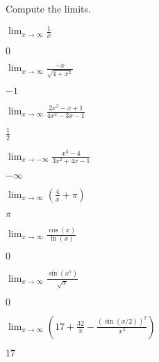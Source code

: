 \begin{exercises}

\noindent Compute the limits.
\twocol
\begin{exercise}
$\lim_{x\to \infty} \frac{1}{x}$
\begin{answer}
$0$
\end{answer}
\end{exercise}

\begin{exercise}
$\lim_{x\to \infty} \frac{-x}{\sqrt{4+x^2}}$
\begin{answer}
$-1$
\end{answer}
\end{exercise}

\begin{exercise}
$\lim_{x\to \infty} \frac{2x^2-x+1}{4x^2-3x-1}$
\begin{answer}
$\frac{1}{2}$
\end{answer}
\end{exercise}

\begin{exercise}
$\lim_{x\to -\infty} \frac{x^3-4}{3x^2+4x-1}$
\begin{answer}
$-\infty$
\end{answer}
\end{exercise}


\begin{exercise}
$\lim_{x\to \infty} \left(\frac{4}{x}+\pi\right)$
\begin{answer}
$\pi$
\end{answer}
\end{exercise}

\begin{exercise}
$\lim_{x\to \infty} \frac{\cos(x)}{\ln(x)}$
\begin{answer}
$0$
\end{answer}
\end{exercise}

\begin{exercise}
$\lim_{x\to \infty} \frac{\sin\left(x^7\right)}{\sqrt{x}}$
\begin{answer}
$0$
\end{answer}
\end{exercise}

\begin{exercise}
$\lim_{x\to \infty} \left(17 + \frac{32}{x} - \frac{\left(\sin(x/2)\right)^2}{x^3}\right)$
\begin{answer}
$17$
\end{answer}
\end{exercise}


\end{exercises}
